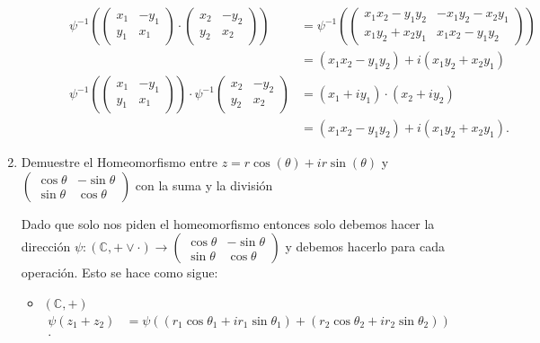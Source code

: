 \documentclass{report}
\begin{document}
\begin{enumerate}
\begin{itemize}
\begin{itemize}
\begin{align*}
	      \psi^{-1}\left( \begin{pmatrix} x_1 & -y_1 \\ y_1&x_1 \end{pmatrix} \cdot \begin{pmatrix} x_2 & -y_2 \\ y_2 & x_2 \end{pmatrix}  \right) &= \psi^{-1}\left( \begin{pmatrix} x_1x_2-y_1y_2 & -x_1y_2-x_2y_1 \\ x_1y_2+x_2y_1 & x_1x_2-y_1y_2 \end{pmatrix} \right) \\
	      &= \left( x_1x_2-y_1y_2 \right) +i\left( x_1y_2+x_2y_1 \right)  \\
	      \psi^{-1}\left( \begin{pmatrix} x_1&-y_1\\y_1&x_1 \end{pmatrix}  \right) \cdot \psi^{-1}\begin{pmatrix} x_2&-y_2\\y_2&x_2 \end{pmatrix} &= \left( x_1 + iy_1 \right) \cdot \left( x_2 + iy_2 \right)  \\
	      &= \left( x_1x_2 - y_1y_2 \right) + i\left( x_1y_2 + x_2y_1 \right)
	    .\end{align*}
	\end{itemize}
    \end{itemize}
  \item Demuestre el Homeomorfismo entre $z = r\cos\left( \theta \right) + ir\sin\left( \theta \right) $ y $\begin{pmatrix} \cos\theta & -\sin\theta \\ \sin\theta & \cos\theta \end{pmatrix} $ con la suma y la división

    Dado que solo nos piden el homeomorfismo entonces solo debemos hacer la dirección $\psi:\left( \mathbb{C},+\lor\cdot  \right) \to \begin{pmatrix} \cos\theta & -\sin\theta \\ \sin\theta & \cos\theta \end{pmatrix} $ y debemos hacerlo para cada operación. Esto se hace como sigue:
    \begin{itemize}
      \item $\left( \mathbb{C}, + \right) $ 
	\begin{align*}
	  \psi\left( z_1 + z_2 \right) &= \psi\left( \left( r_1\cos\theta_1 + ir_1\sin\theta_1 \right) + \left( r_2\cos\theta_2 + ir_2\sin\theta_2 \right)  \right)  \\
	.\end{align*}
    \end{itemize}
\end{enumerate}
\end{document}
